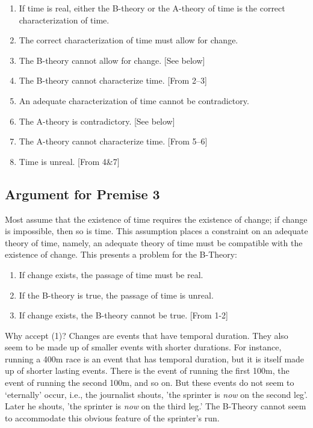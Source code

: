 \documentclass[oneside]{article}
\begin{document}
\begin{enumerate}
\item If time is real, either the B-theory or the A-theory of time is the correct characterization of time. 
\item The correct characterization of time must allow for change. 
\item The B-theory cannot allow for change. [See below]
\item The B-theory cannot characterize time. [From 2--3]
\item An adequate characterization of time cannot be contradictory. 
\item The A-theory is contradictory. [See below]
\item The A-theory cannot characterize time. [From 5--6] 
\item Time is unreal. [From 4\&7]
\end{enumerate}



\subsection*{Argument for Premise 3}
Most assume that the existence of time requires the existence of change; if change is impossible, then so is time. This assumption places a constraint on an adequate theory of time, namely, an adequate theory of time must be compatible with the existence of change. This presents a problem for the B-Theory: 
\begin{enumerate}
\item If change exists, the passage of time must be real.
\item If the B-theory is true, the passage of time is unreal.
\item If change exists, the B-theory cannot be true. [From 1-2]
\end{enumerate} 

Why accept (1)?  Changes are events that have temporal duration. They also seem to be made up of smaller events with shorter durations. For instance, running a 400m race is an event that has temporal duration, but it is itself made up of shorter lasting events. There is the event of running the first 100m, the event of running the second 100m, and so on. But these events do not seem to `eternally' occur, i.e., the journalist shouts, 'the sprinter is \emph{now} on the second leg'. Later he shouts, 'the sprinter is \emph{now} on the third leg.'  The B-Theory cannot seem to accommodate this obvious feature of the sprinter's run. 
 
\end{document}
